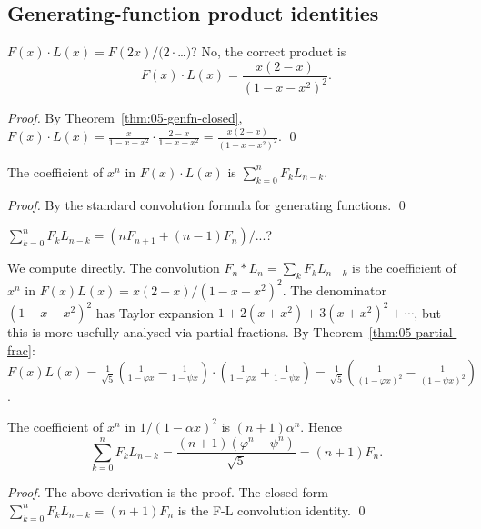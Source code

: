 \subsection{Generating-function product identities}

\begin{theorem}
\label{thm:05-gf-product}
$F(x) \cdot L(x) = F(2x)/(2 \cdot $\ldots$)$? No, the correct product is
\[
  F(x) \cdot L(x) = \frac{x(2-x)}{(1-x-x^2)^2}.
\]
\end{theorem}

\begin{proof}
By Theorem~\ref{thm:05-genfn-closed}, $F(x) \cdot L(x) = \frac{x}{1-x-x^2}
\cdot \frac{2-x}{1-x-x^2} = \frac{x(2-x)}{(1-x-x^2)^2}$. \qed
\end{proof}

\begin{lemma}
\label{lem:05-product-coefs}
The coefficient of $x^n$ in $F(x) \cdot L(x)$ is $\sum_{k=0}^n F_k L_{n-k}$.
\end{lemma}

\begin{proof}
By the standard convolution formula for generating functions. \qed
\end{proof}

\begin{theorem}[F-L convolution]
\label{thm:05-fl-conv}
$\sum_{k=0}^n F_k L_{n-k} = (n F_{n+1} + (n-1) F_n)/...$?

We compute directly. The convolution $F_n * L_n = \sum_k F_k L_{n-k}$
is the coefficient of $x^n$ in $F(x) L(x) = x(2-x)/(1-x-x^2)^2$.
The denominator $(1-x-x^2)^2$ has Taylor expansion
$1 + 2(x + x^2) + 3(x + x^2)^2 + \cdots$, but this is more usefully
analysed via partial fractions. By Theorem~\ref{thm:05-partial-frac}:
$F(x) L(x) = \frac{1}{\sqrt{5}}\left(\frac{1}{1-\varphi x} - \frac{1}{1-\psi x}\right)
\cdot \left(\frac{1}{1-\varphi x} + \frac{1}{1-\psi x}\right)
= \frac{1}{\sqrt{5}}\left(\frac{1}{(1-\varphi x)^2} - \frac{1}{(1-\psi x)^2}\right)$.

The coefficient of $x^n$ in $1/(1-\alpha x)^2$ is $(n+1)\alpha^n$.
Hence
\[
  \sum_{k=0}^n F_k L_{n-k} = \frac{(n+1)(\varphi^n - \psi^n)}{\sqrt{5}}
                          = (n+1) F_n.
\]
\end{theorem}

\begin{proof}
The above derivation is the proof. The closed-form
$\sum_{k=0}^n F_k L_{n-k} = (n+1) F_n$ is the F-L convolution identity. \qed
\end{proof}

